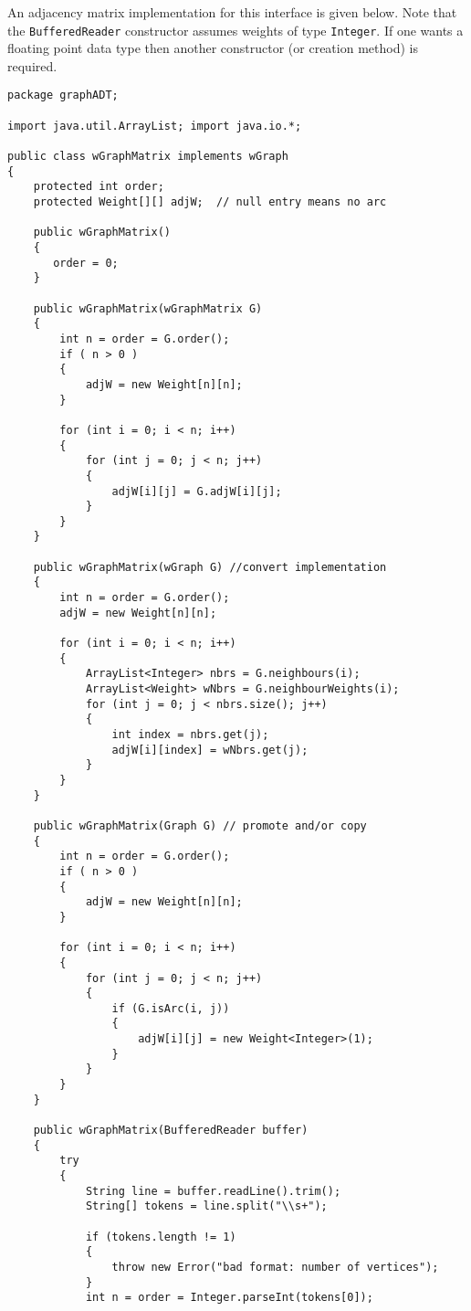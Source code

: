 An adjacency matrix implementation for this interface is given below.
Note that the \verb|BufferedReader| constructor assumes weights of type
\verb|Integer|. If one wants a floating point data type then another
constructor (or creation method) is required.

{\renewcommand{\ttdefault}{pcr} %
\footnotesize \begin{verbatim}
package graphADT;

import java.util.ArrayList; import java.io.*;

public class wGraphMatrix implements wGraph
{
    protected int order;
    protected Weight[][] adjW;  // null entry means no arc

    public wGraphMatrix()
    {
       order = 0;
    }

    public wGraphMatrix(wGraphMatrix G)
    {
        int n = order = G.order();
        if ( n > 0 )
        {
            adjW = new Weight[n][n];
        }

        for (int i = 0; i < n; i++)
        {
            for (int j = 0; j < n; j++)
            {
                adjW[i][j] = G.adjW[i][j];
            }
        }
    }

    public wGraphMatrix(wGraph G) //convert implementation
    {
        int n = order = G.order();
        adjW = new Weight[n][n];

        for (int i = 0; i < n; i++)
        {
            ArrayList<Integer> nbrs = G.neighbours(i);
            ArrayList<Weight> wNbrs = G.neighbourWeights(i);
            for (int j = 0; j < nbrs.size(); j++)
            {
                int index = nbrs.get(j);
                adjW[i][index] = wNbrs.get(j);
            }
        }
    }

    public wGraphMatrix(Graph G) // promote and/or copy
    {
        int n = order = G.order();
        if ( n > 0 )
        {
            adjW = new Weight[n][n];
        }

        for (int i = 0; i < n; i++)
        {
            for (int j = 0; j < n; j++)
            {
                if (G.isArc(i, j))
                {
                    adjW[i][j] = new Weight<Integer>(1);
                }
            }
        }
    }

    public wGraphMatrix(BufferedReader buffer) 
    {
        try
        {
            String line = buffer.readLine().trim();
            String[] tokens = line.split("\\s+");

            if (tokens.length != 1)
            {
                throw new Error("bad format: number of vertices");
            }
            int n = order = Integer.parseInt(tokens[0]);


\end{verbatim}}
